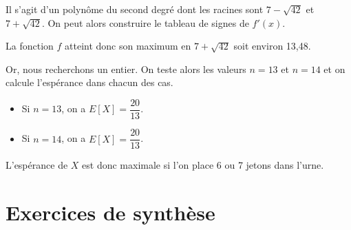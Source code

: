 \documentclass[11pt,fleqn, openany]{book} %
\begin{document}
\begin{solution}
Il s'agit d'un polynôme du second degré dont les racines sont $7-\sqrt{42}$ et $7+\sqrt{42}$. On peut alors construire le tableau de signes de $f'(x)$.

\begin{center}
\end{center}

La fonction $f$ atteint donc son maximum en $7+\sqrt{42}$ soit environ 13,48.

Or, nous recherchons un entier. On teste alors les valeurs $n=13$ et $n=14$ et on calcule l'espérance dans chacun des cas.
\begin{itemize}
\item Si $n=13$, on a $E[X]= \dfrac{20}{13}$.
\item Si $n=14$, on a $E[X]=\dfrac{20}{13}$.
\end{itemize}

L'espérance de $X$ est donc maximale si l'on place 6 ou 7 jetons dans l'urne.

\end{solution}






\section*{Exercices de synthèse}
\end{document}
